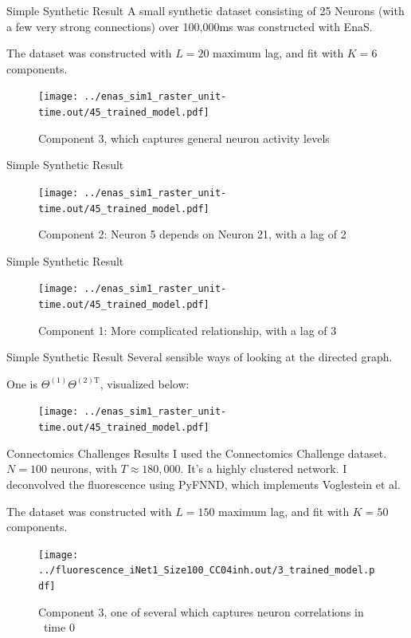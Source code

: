 \documentclass[xcolor=svgnames]{beamer}
\begin{document}
\begin{frame}{Simple Synthetic Result}
	A small synthetic dataset consisting of 25 Neurons (with a few very strong connections) over 100,000ms was constructed with EnaS.

	The dataset was constructed with $L=20$ maximum lag, and fit with $K=6$ components.

	\begin{figure}[h]
	\centering
	\texttt{[image: ../enas\_sim1\_raster\_unit-time.out/45\_trained\_model.pdf]}
	\caption{Component 3, which captures general neuron activity levels}
	\end{figure}
\end{frame}

\begin{frame}{Simple Synthetic Result}
	\begin{figure}[h]
	\centering
	\texttt{[image: ../enas\_sim1\_raster\_unit-time.out/45\_trained\_model.pdf]}
	\caption{Component 2: Neuron 5 depends on Neuron 21, with a lag of 2}
	\end{figure}
\end{frame}

\begin{frame}{Simple Synthetic Result}
	\begin{figure}[h]
	\centering
	\texttt{[image: ../enas\_sim1\_raster\_unit-time.out/45\_trained\_model.pdf]}
	\caption{Component 1: More complicated relationship, with a lag of 3}
	\end{figure}
\end{frame}

\begin{frame}{Simple Synthetic Result}
Several sensible ways of looking at the directed graph.

One is $\Theta^{(1)} \Theta^{(2)\textrm{T}}$, visualized below:
\begin{figure}[h]
	\centering
	\texttt{[image: ../enas\_sim1\_raster\_unit-time.out/45\_trained\_model.pdf]}
	\end{figure}
\end{frame}


\begin{frame}{Connectomics Challenges Results}
	I used the Connectomics Challenge dataset. $N=100$ neurons, with $T\approx 180,000$. It's a highly clustered network. I deconvolved the fluorescence using PyFNND, which implements Voglestein et al.

	The dataset was constructed with $L=150$ maximum lag, and fit with $K=50$ components.

	\begin{figure}[h]
	\centering
	\texttt{[image: ../fluorescence\_iNet1\_Size100\_CC04inh.out/3\_trained\_model.pdf]}
	\caption{Component 3, one of several which captures neuron correlations in ~time 0}
	\end{figure}
\end{frame}
\end{document}
